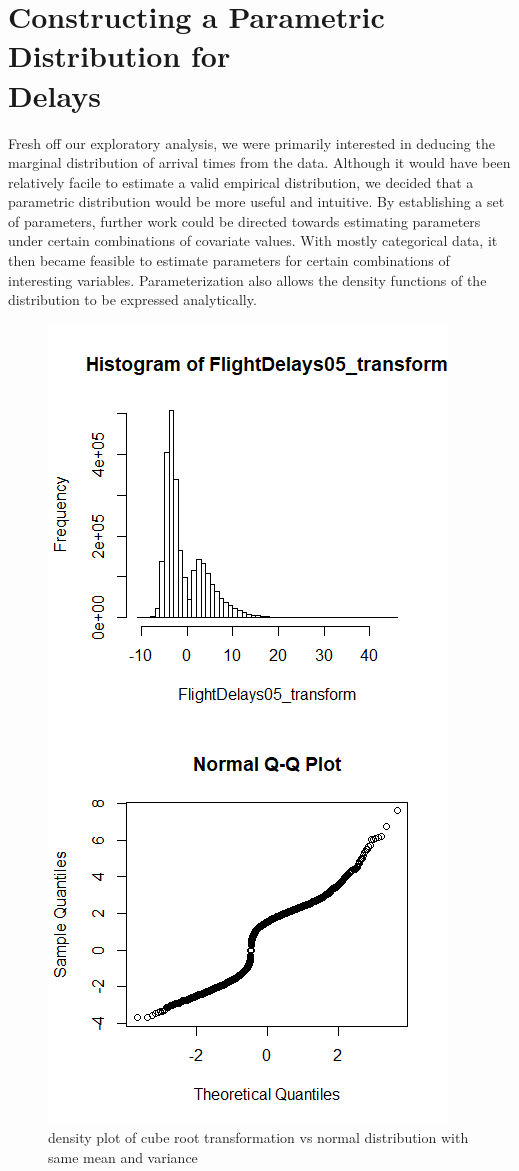 \documentclass[12pt, a4paper, openany]{book}
\newcommand\tab[1][1cm]{\hspace*{#1}}
\begin{document}
	\section{Constructing a Parametric Distribution for \\Delays}
	 \tab Fresh off our exploratory analysis, we were primarily interested in deducing the marginal distribution of arrival times from the data. Although it would have been relatively facile to estimate a valid empirical distribution, we decided that a parametric distribution would be more useful and intuitive. By establishing a set of parameters, further work could be directed towards estimating parameters under certain combinations of covariate values. With mostly categorical data, it then became feasible to estimate parameters for certain combinations of interesting variables. Parameterization also allows the density functions of the distribution to be expressed analytically.\\
	 		\begin{figure}
			\centering
	 		\includegraphics[width = .35 \textwidth]{../figures/shittysqrt}
	 		\caption{ density plot of cube root transformation vs normal distribution with same mean and variance}
	 		\end{figure}
\end{document}
